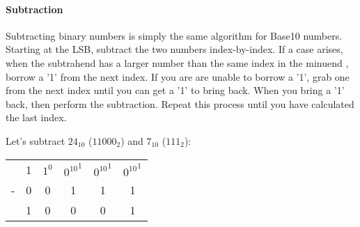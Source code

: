     \paragraph*{Subtraction} Subtracting binary numbers is simply the same algorithm for Base10 numbers.
    Starting at the LSB, subtract the two numbers index-by-index.
    If a case arises, when the subtrahend  has a larger number than the same index in the minuend , borrow a '1' from the next index.
    If you are are unable to borrow a '1', grab one from the next index until you can get a '1' to bring back.
    When you bring a '1' back, then perform the subtraction.
    Repeat this process until you have calculated the last index.
    
    \begin{example}
        Let's subtract $24_{10}$ ($11000_2$) and $7_{10}$ ($111_2$):
        \begin{center}
            \begin{tabular}{cccccc}
                  & 1 & $1^0$ & ${0^{10}}^1$ & ${0^{10}}^1$ & ${0^{10}}^1$  \\
                - & 0 & 0     & 1            & 1            & 1             \\
                \hline
                  & 1 & 0     & 0            & 0            & 1             \\
            \end{tabular}
        \end{center}
    \end{example}

